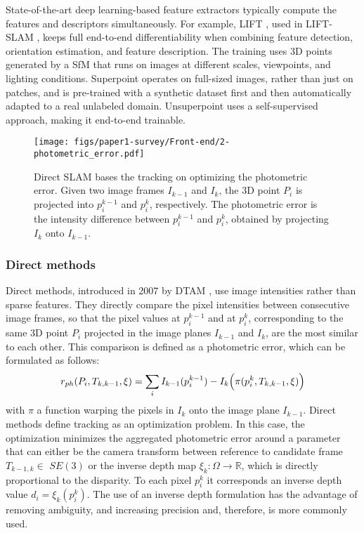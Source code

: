 State-of-the-art deep learning-based feature extractors  typically compute the features and descriptors simultaneously. For example, \ac{LIFT} \cite{yi2016liftdescriptor}, used in LIFT-SLAM \cite{bruno2021lift}, keeps full end-to-end differentiability when combining feature detection, orientation estimation, and feature description. The training uses 3D points generated by a \ac{SfM} that runs on images at different scales, viewpoints, and lighting conditions.
Superpoint \cite{2018superpoint} operates on full-sized images, rather than just on patches, and is pre-trained with a synthetic dataset first and then automatically adapted to a real unlabeled domain. Unsuperpoint \cite{christiansen2019unsuperpoint} uses a self-supervised approach, making it end-to-end trainable.
\begin{figure}[b!]

    \centering
    \smallskip
    \texttt{[image: figs/paper1-survey/Front-end/2-photometric\_error.pdf]}
    \caption[Diagram showcasing how direct SLAM bases the tracking on optimizing the photometric error]{Direct SLAM bases the tracking on optimizing the photometric error. Given two image frames $I_{k-1}$ and  $I_k$, the 3D point $P_i$ is projected into  $p^{k-1}_i$ and $p^k_{i}$, respectively. The photometric error is the intensity difference between $p^{k-1}_i$ and $p^k_{i}$, obtained by projecting $I_k$ onto $I_{k-1}$.}
    \label{fig:photometric}
\end{figure}


\subsubsection{Direct methods}
\label{sec:frontend:directmethods}
Direct methods, introduced in 2007 by DTAM \cite{klein2007dtam}, use image intensities rather than sparse features. They directly compare the pixel intensities between consecutive image frames, so that the pixel values at $p^{k-1}_i$ and at $p^k_{i}$, corresponding to the same 3D point $P_i$ projected in the image planes $I_{k-1}$ and $I_k$, are the most similar to each other. This comparison is defined as a photometric error, which can be formulated as follows:
\begin{equation}
    r_{ph}(P_i,T_{k,k-1},\xi) = \sum_i I_{k-1}(p^{k-1}_i) - I_k\Bigl(\pi (p^{k}_i,T_{k,k-1},\xi)\Bigr)
\end{equation}
with $\pi$ a function warping the pixels in $I_k$ onto the image plane $I_{k-1}$.
Direct methods define tracking as an optimization problem. In this case, the optimization minimizes the aggregated photometric error around a parameter that can either be the camera transform between reference to candidate frame $T_{k-1,k} \in$ $SE(3)$ or the inverse depth map $\xi_k:\Omega\rightarrow \mathbb{R}$, which is directly proportional to the disparity. To each pixel $p^{k}_i$ it corresponds an inverse depth value $d_i = \xi_k(p^{k}_i)$. The use of an inverse depth formulation has the advantage of removing ambiguity, and increasing precision \cite{okutomi1993stereomatch} and, therefore, is more commonly used.

